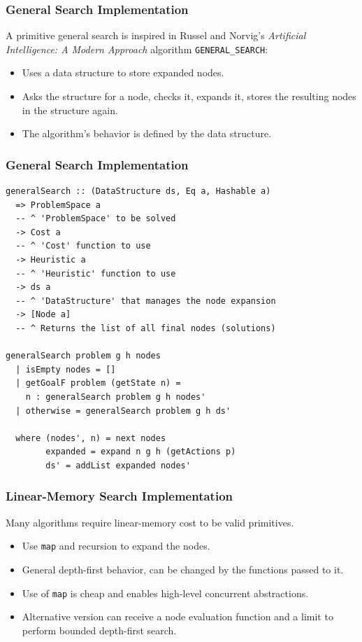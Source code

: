 \documentclass{beamer}
\begin{document}
\begin{frame}
  \frametitle{General Search Implementation}
  A primitive general search is inspired in Russel and Norvig's
  \emph{Artificial Intelligence: A Modern Approach} algorithm
  \texttt{GENERAL\_SEARCH}:
  \begin{itemize}
  \item Uses a data structure to store expanded nodes.
  \item Asks the structure for a node, checks it, expands it, stores the
    resulting nodes in the structure again.
  \item The algorithm's behavior is defined by the data structure.
  \end{itemize}
\end{frame}

\begin{frame}[fragile]
  \frametitle{General Search Implementation}
\begin{lstlisting}[style=haskell]
generalSearch :: (DataStructure ds, Eq a, Hashable a)
  => ProblemSpace a
  -- ^ 'ProblemSpace' to be solved
  -> Cost a
  -- ^ 'Cost' function to use
  -> Heuristic a
  -- ^ 'Heuristic' function to use
  -> ds a
  -- ^ 'DataStructure' that manages the node expansion
  -> [Node a]
  -- ^ Returns the list of all final nodes (solutions)

generalSearch problem g h nodes
  | isEmpty nodes = []
  | getGoalF problem (getState n) =
    n : generalSearch problem g h nodes'
  | otherwise = generalSearch problem g h ds'

  where (nodes', n) = next nodes
        expanded = expand n g h (getActions p)
        ds' = addList expanded nodes'
\end{lstlisting}
\end{frame}

\begin{frame}
  \frametitle{Linear-Memory Search Implementation}
  Many algorithms require linear-memory cost to be valid primitives.
  \begin{itemize}
  \item Use \texttt{map} and recursion to expand the nodes.
  \item General depth-first behavior, can be changed by the functions passed to
    it.
  \item Use of \texttt{map} is cheap and enables high-level concurrent
    abstractions.
  \item Alternative version can receive a node evaluation function and a limit
    to perform bounded depth-first search.
  \end{itemize}
\end{frame}
\end{document}
